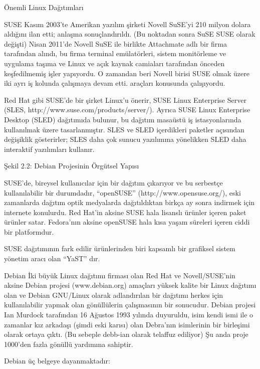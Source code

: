 \begin{section}{Önemli Linux Dağıtımları}
\begin{subsection}{SUSE}
Kasım 2003'te Amerikan yazılım şirketi Novell SuSE'yi 210 milyon dolara aldığını ilan etti; anlaşma sonuçlandırıldı. (Bu noktadan sonra SuSE SUSE olarak değişti) Nisan 2011'de Novell SuSE ile birlikte Attachmate adlı bir firma tarafından alındı, bu firma terminal emülatörleri, sistem monitörleme ve uygulama taşıma ve Linux ve açık kaynak camiaları tarafından önceden keşfedilmemiş işler yapıyordu. O zamandan beri Novell birisi SUSE olmak üzere iki ayrı iş kolunda çalışmaya devam etti. araçları konusunda çalışıyordu.

Red Hat gibi SUSE'de bir şirket Linux'u önerir, SUSE Linux Enterprise Server (SLES, http://www.suse.com/products/server/). Ayrıca SUSE Linux Enterprise Desktop (SLED) dağıtımıda bulunur, bu dağıtım masaüstü iş istasyonlarında kullanılmak üzere tasarlanmıştır. SLES ve SLED içerdikleri paketler açısından değişiklik gösterirler; SLES daha çok sunucu yazılımına yönelikken SLED daha interaktif yazılımları kullanır.

Şekil 2.2: Debian Projesinin Örgütsel Yapısı

SUSE'de, bireysel kullanıcılar için bir dağıtım çıkarıyor ve bu serbestçe kullanılabilir bir durumdadır, “openSUSE” (http://www.opensuse.org/), eski zamanlarda dağıtım optik medyalarda dağıtıldıktan birkça ay sonra indirmek için internete konulurdu. Red Hat'in aksine SUSE hala lisanslı ürünler içeren paket ürünler satar. Fedora'nın aksine openSUSE hala kısa yaşam süreleri içeren ciddi bir platformdur.

SUSE dağıtımının fark edilir ürünlerinden biri kapsamlı bir grafiksel sistem yönetim aracı olan “YaST” dır.

\end{subsection}
\begin{subsection}{Debian}
\label{sec:bolum244}
İki büyük Linux dağıtımı firması olan Red Hat ve Novell/SUSE'nin aksine Debian projesi (www.debian.org) amaçları yüksek kalite bir Linux dağıtımı olan ve Debian GNU/Linux olarak adlandırılan bir dağıtımı herkes için kullanılabilir yapmak olan gönüllülerin çalışmasının bir sonucudur. Debian projesi Ian Murdock tarafından 16 Ağustos 1993 yılında duyuruldu, isim kendi ismi ile o zamanlar kız arkadaşı (şimdi eski karısı) olan Debra'nın isimlerinin bir birleşimi olarak ortaya çıktı. (Bu sebeple debb-ian olarak telaffuz ediliyor) Şu anda proje 1000'den fazla gönüllü yardımına sahiptir.

Debian üç belgeye dayanmaktadır:


\end{subsection}
\end{section}
